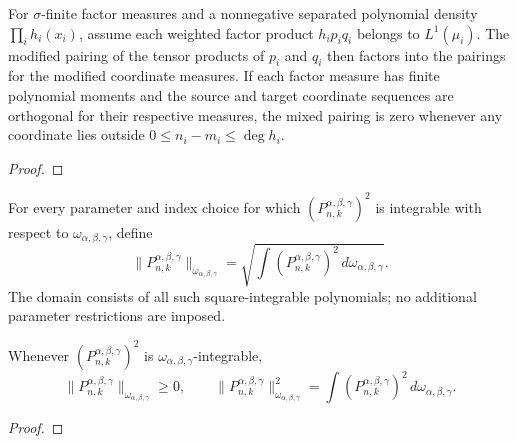 \begin{theorem}
\label{thm:tensor-product-modification}
\leanok
For $\sigma$-finite factor measures and a nonnegative separated polynomial density $\prod_i h_i(x_i)$, assume each weighted factor product $h_i p_i q_i$ belongs to $L^1(\mu_i)$. The modified pairing of the tensor products of $p_i$ and $q_i$ then factors into the pairings for the modified coordinate measures. If each factor measure has finite polynomial moments and the source and target coordinate sequences are orthogonal for their respective measures, the mixed pairing is zero whenever any coordinate lies outside $0\le n_i-m_i\le\deg h_i$.
\end{theorem}
\begin{proof}
\leanok
\end{proof}

\begin{supporting}
\begin{definition}
\label{def:proriol-norm}
\leanok
For every parameter and index choice for which $(P_{n,k}^{\alpha,\beta,\gamma})^2$ is
integrable with respect to $\omega_{\alpha,\beta,\gamma}$, define
\[
 \|P_{n,k}^{\alpha,\beta,\gamma}\|_{\omega_{\alpha,\beta,\gamma}}=\sqrt{\int (P_{n,k}^{\alpha,\beta,\gamma})^2\,d\omega_{\alpha,\beta,\gamma}}.
\]
The domain consists of all such square-integrable polynomials; no additional
parameter restrictions are imposed.
\end{definition}
\begin{theorem}
\label{thm:proriol-norm}
\leanok
Whenever $(P_{n,k}^{\alpha,\beta,\gamma})^2$ is $\omega_{\alpha,\beta,\gamma}$-integrable,
\[
 \|P_{n,k}^{\alpha,\beta,\gamma}\|_{\omega_{\alpha,\beta,\gamma}}\ge0,\qquad
 \|P_{n,k}^{\alpha,\beta,\gamma}\|_{\omega_{\alpha,\beta,\gamma}}^2=\int (P_{n,k}^{\alpha,\beta,\gamma})^2\,d\omega_{\alpha,\beta,\gamma}.
\]
\end{theorem}
\begin{proof}
\leanok
\end{proof}
\end{supporting}


